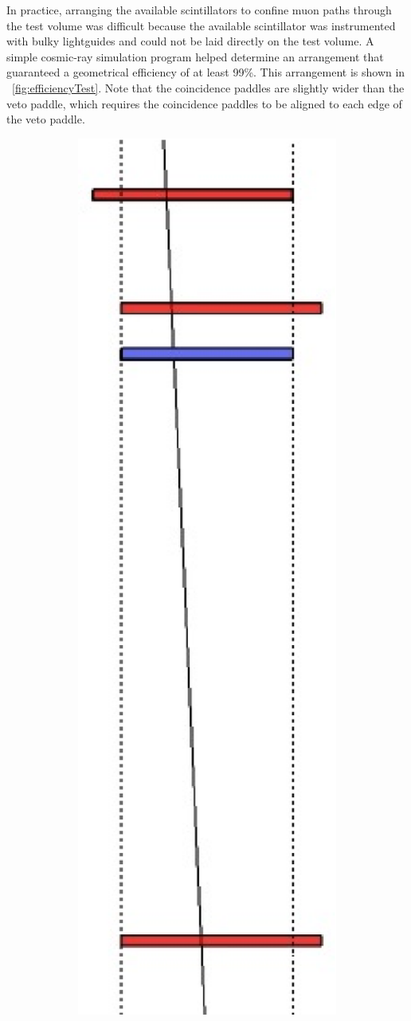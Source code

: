 In practice, arranging the available scintillators to confine muon paths through the test volume was difficult because the available scintillator was instrumented with bulky lightguides and could not be laid directly on the test volume.  A simple cosmic-ray simulation program helped determine an arrangement that guaranteed a geometrical efficiency of at least 99\%.  This arrangement is shown in {\fig}~\ref{fig:efficiencyTest}.  Note that the coincidence paddles are slightly wider than the veto paddle, which requires the coincidence paddles to be aligned to each edge of the veto paddle.  
\begin{figure}[htp]
\centering
\includegraphics[width=1.0\textwidth]{figures/veto_test_layout.eps}

\end{figure}
